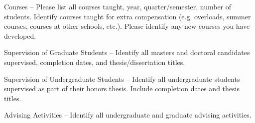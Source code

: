 Courses -- Please list all courses taught, year, quarter/semester, number of students. 
Identify courses taught for extra compensation (e.g. overloads, summer courses, courses at other schools, etc.). 
Please identify any new courses you have developed.

Supervision of Graduate Students -- Identify all masters and doctoral candidates supervised, completion dates, and thesis/dissertation titles.

Supervision of Undergraduate Students -- Identify all undergraduate students supervised as part of their honors thesis. 
Include completion dates and thesis titles.

Advising Activities -- Identify all undergraduate and graduate advising activities.
